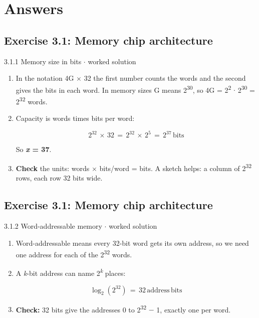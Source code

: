 \documentclass[11pt]{article}
\begin{document}
\clearpage
\section{Answers}
\begin{keepsection}\subsection{Exercise 3.1: Memory chip architecture}

\begin{workedbox}{3.1.1 Memory size in bits \ensuremath{\cdot} worked solution}
\begin{enumerate}
\item In the notation 4G \ensuremath{\times} 32 the first number counts the words and the second gives the bits in each word. In memory sizes G means 2\textsuperscript{30}, so 4G = 2\textsuperscript{2} \ensuremath{\cdot} 2\textsuperscript{30} = 2\textsuperscript{32} words.
\item {}
Capacity is words times bits per word:

\begin{equation*}2^{32}\, \times \, 32\, =\, 2^{32}\, \times \, 2^{5}\, =\, 2^{37}\, \text{bits}\end{equation*}

So \textbf{\textit{x} = 37}.
\item \textbf{Check} the units: words \ensuremath{\times} bits/word = bits. A sketch helps: a column of 2\textsuperscript{32} rows, each row 32 bits wide.
\end{enumerate}
\end{workedbox}

\end{keepsection}
\begin{keepsection}\subsection{Exercise 3.1: Memory chip architecture}

\begin{workedbox}{3.1.2 Word-addressable memory \ensuremath{\cdot} worked solution}
\begin{enumerate}
\item Word-addressable means every 32-bit word gets its own address, so we need one address for each of the 2\textsuperscript{32} words.
\item {}
A \textit{k}-bit address can name 2\textsuperscript{\textit{k}} places:

\begin{equation*}\log _{2}(2^{32})\, =\, 32\, \text{address}\, \text{bits}\end{equation*}
\item \textbf{Check:} 32 bits give the addresses 0 to 2\textsuperscript{32} \ensuremath{-} 1, exactly one per word.
\end{enumerate}
\end{workedbox}

\end{keepsection}
\end{document}
